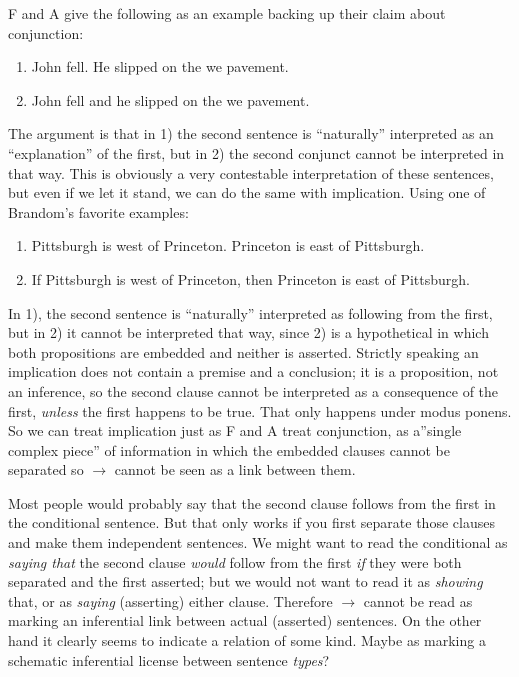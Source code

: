 \documentclass{article}
\begin{document}
F and A give the following as an example backing up their claim about
conjunction:

\begin{enumerate}
\item John fell.  He slipped on the we pavement.
\item John fell and he slipped on the we pavement.
\end{enumerate}

The argument is that in 1) the second sentence is ``naturally''
interpreted as an ``explanation'' of the first, but in 2) the second
conjunct cannot be interpreted in that way.  This is obviously a very
contestable interpretation of these sentences, but even if we let it
stand, we can do the same with implication.  Using one of Brandom's
favorite examples:

\begin{enumerate}
\item Pittsburgh is west of Princeton.  Princeton is east of Pittsburgh.
\item If Pittsburgh is west of Princeton, then Princeton is east of Pittsburgh.
\end{enumerate}

In 1), the second sentence is ``naturally'' interpreted as following
from the first, but in 2) it cannot be interpreted that way, since 2)
is a hypothetical in which both propositions are embedded and neither
is asserted.  Strictly speaking an implication does not contain a
premise and a conclusion; it is a proposition, not an inference, so
the second clause cannot be interpreted as a consequence of the first,
\emph{unless} the first happens to be true.  That only happens under
modus ponens.  So we can treat implication just as F and A treat
conjunction, as a''single complex piece'' of information in which the
embedded clauses cannot be separated so \(\to\) cannot be seen as a
link between them.

\begin{remark}
  Most people would probably say that the second clause follows from
  the first in the conditional sentence.  But that only works if you
  first separate those clauses and make them independent sentences.
  We might want to read the conditional as \emph{saying that} the
  second clause \emph{would} follow from the first \emph{if} they were
  both separated and the first asserted; but we would not want to read
  it as \emph{showing} that, or as \emph{saying} (asserting) either
  clause.  Therefore \(\to\) cannot be read as marking an inferential
  link between actual (asserted) sentences.  On the other hand it
  clearly seems to indicate a relation of some kind.  Maybe as marking
  a schematic inferential license between sentence \emph{types}?
\end{remark}
\end{document}
